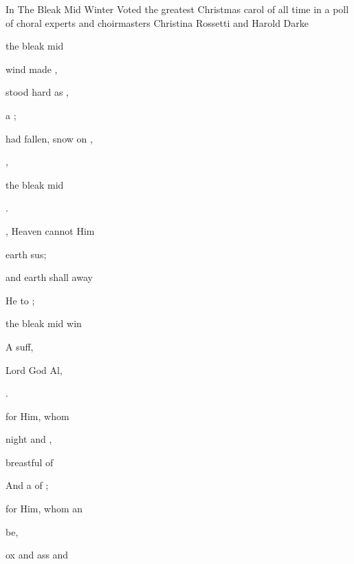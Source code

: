 \begin{SBSong}{In The Bleak Mid Winter}
    {Voted the greatest Christmas carol of all time in a poll of choral experts and choirmasters}
    {Christina Rossetti and Harold Darke}
  \begin{SBVerse}
     the bleak mid 
    
     wind made ,
    
     stood hard as , 
    
      a ;
    
     had fallen, snow on , 
    
      , 
    
     the bleak mid 

     .
  \end{SBVerse}
  \begin{SBVerse}
    , Heaven cannot  Him 
    
     earth sus;
    
     and earth shall  away
    
     He  to ;
    
     the bleak mid win 
    
    A   suff, 
    
     Lord God Al, 
    
     .
  \end{SBVerse}
  \begin{SBVerse}
     for Him, whom  
    
     night and ,
    
     breastful of  
    
    And a   of ;
    
     for Him, whom an 
    
      be, 
    
     ox and ass and  
    

\end{SBVerse}
\end{SBSong}
